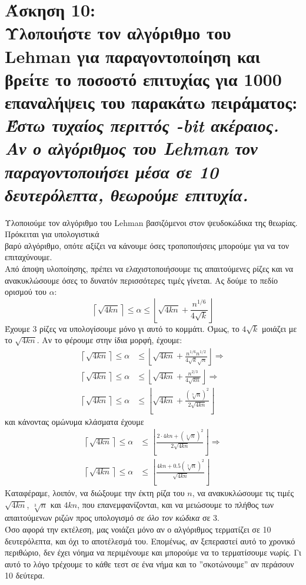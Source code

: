 \documentclass{article}
\newcommand{\lt}[1]{\latintext #1\greektext}
\newcommand{\task}[2]{\newpage\section*{Άσκηση #1:\\#2}}
\newcommand{\myceil}[1]{\left \lceil #1 \right \rceil}
\newcommand{\myfloor}[1]{\left \lfloor #1 \right \rfloor}
\begin{document}
\task{10}{
    Υλοποιήστε τον αλγόριθμο του \lt{Lehman} για παραγοντοποίηση και βρείτε το ποσοστό επιτυχίας για 1000 επαναλήψεις του παρακάτω πειράματος:\\
    \textit{Έστω τυχαίος περιττός \lt{100-bit} ακέραιος. Αν ο αλγόριθμος του \lt{Lehman} τον παραγοντοποιήσει μέσα σε 10 δευτερόλεπτα, θεωρούμε επιτυχία.}
}
{
    Υλοποιούμε τον αλγόριθμο του \lt{Lehman} βασιζόμενοι στον ψευδοκώδικα της θεωρίας. Πρόκειται για υπολογιστικά\\ βαρύ αλγόριθμο, οπότε αξίζει να κάνουμε όσες τροποποιήσεις μπορούμε για να τον επιταχύνουμε.\\
    
    Από άποψη υλοποίησης, πρέπει να ελαχιστοποιήσουμε τις απαιτούμενες ρίζες και να ανακυκλώσουμε όσες το δυνατόν περισσότερες τιμές γίνεται. Ας δούμε το πεδίο ορισμού του $\alpha$:
    \begin{equation*}
        \myceil{\sqrt{4kn}} \leq \alpha \leq \myfloor{\sqrt{4kn} + \frac{n^{1/6}}{4\sqrt{k}}}
    \end{equation*}
    Έχουμε 3 ρίζες να υπολογίσουμε μόνο γι αυτό το κομμάτι. Όμως, το $4\sqrt{k}$ μοιάζει με το $\sqrt{4kn}$. Αν το φέρουμε στην ίδια μορφή, έχουμε:
    \begin{align*}
        \myceil{\sqrt{4kn}} \leq \alpha &\leq \myfloor{\sqrt{4kn} + \frac{n^{1/6}n^{1/2}}{4\sqrt{k}\sqrt{n}}} \Rightarrow\\
        \myceil{\sqrt{4kn}} \leq \alpha &\leq \myfloor{\sqrt{4kn} + \frac{n^{2/3}}{4\sqrt{kn}}} \Rightarrow\\
        \myceil{\sqrt{4kn}} \leq \alpha &\leq \myfloor{\sqrt{4kn} + \frac{(\sqrt[3]{n})^2}{2\sqrt{4kn}}}
    \end{align*}
    και κάνοντας ομώνυμα κλάσματα έχουμε
    \begin{align*}
        \myceil{\sqrt{4kn}} \leq \alpha &\leq \myfloor{\frac{2\cdot4kn + (\sqrt[3]{n})^2}{2\sqrt{4kn}}} \Rightarrow\\
        \myceil{\sqrt{4kn}} \leq \alpha &\leq \myfloor{\frac{4kn + 0.5(\sqrt[3]{n})^2}{\sqrt{4kn}}}
    \end{align*}
    Καταφέραμε, λοιπόν, να διώξουμε την έκτη ρίζα του $n$, να ανακυκλώσουμε τις τιμές $\sqrt{4kn}$, $\sqrt[3]{n}$ και $4kn$, που επανεμφανίζονται, και να μειώσουμε το πλήθος των απαιτούμενων ριζών προς υπολογισμό σε \textit{όλο τον κώδικα} σε 3.\\
    
    Όσο αφορά την εκτέλεση, μας νοιάζει μόνο αν ο αλγόριθμος τερματίζει σε 10 δευτερόλεπτα, και όχι το αποτέλεσμά του. Επομένως, αν ξεπεραστεί αυτό το χρονικό περιθώριο, δεν έχει νόημα να περιμένουμε και μπορούμε να το τερματίσουμε νωρίς. Γι αυτό το λόγο τρέχουμε το κάθε τεστ σε ένα νήμα και το ''σκοτώνουμε'' αν περάσουν 10 δεύτερα.\\
    
}
\end{document}
